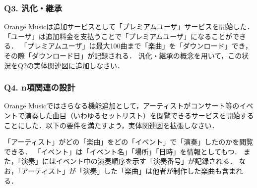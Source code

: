 \subsubsection{Q3. 汎化・継承}
Orange Musicは追加サービスとして「プレミアムユーザ」サービスを開始した．
「ユーザ」は追加料金を支払うことで「プレミアムユーザ」になることができる．
「プレミアムユーザ」は最大100曲まで「楽曲」を「ダウンロード」でき，その際「ダウンロード日」が記録される．
汎化・継承の概念を用いて，この状況をQ2の実体関連図に追加しなさい．


\subsubsection{Q4. n項関連の設計}
Orange Musicではさらなる機能追加として，アーティストがコンサート等のイベントで演奏した曲目（いわゆるセットリスト）を閲覧できるサービスを開始することにした．以下の要件を満たすよう，実体関連図を拡張しなさい．

\begin{framed}
「アーティスト」がどの「楽曲」をどの「イベント」で「演奏」したのかを閲覧できる．
「イベント」は「イベント名」「場所」「日時」を情報としてもつ．
また，「演奏」にはイベント中の演奏順序を示す「演奏番号」が記録される．
なお，「アーティスト」が「演奏」した「楽曲」は他者が制作した楽曲も含まれる．
\end{framed}



